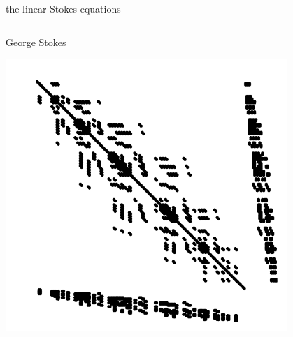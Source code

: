 \documentclass[10pt,
               hyperref={colorlinks,citecolor=DeepPink4,linkcolor=black,urlcolor=blue},
               svgnames]{beamer}
\begin{document}
\begin{frame}{the linear Stokes equations}
\begin{columns}
\begin{column}{0.4\textwidth}
\hfill {\tiny George Stokes}

\vspace{7mm}
\hfill \includegraphics[width=0.8\textwidth]{figs/Kstokes.pdf}
\end{column}

\end{columns}
\end{frame}
\end{document}
